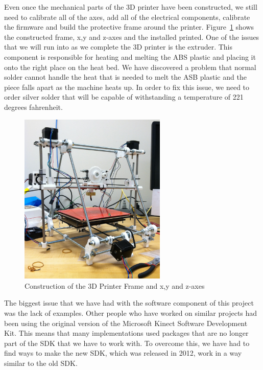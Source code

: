 \documentclass[12pt,twocolumn]{article}
\begin{document}
\indent Even once the mechanical parts of the 3D printer have been constructed, we still need to calibrate all of the axes, add all of the electrical components, calibrate the firmware and build the protective frame around the printer. Figure~\ref{basebuilt} shows the constructed frame, x,y and z-axes and the installed printed. One of the issues that we will run into as we complete the 3D printer is the extruder. This component is responsible for heating and melting the ABS plastic and placing it onto the right place on the heat bed. We have discovered a problem that normal solder cannot handle the heat that is needed to melt the ASB plastic and the piece falls apart as the machine heats up. In order to fix this issue, we need to order silver solder that will be capable of withstanding a temperature of 221 degrees fahrenheit. 
\begin{figure}[H]
\centering
\includegraphics[width=70mm]{photo.JPG}
\caption{Construction of the 3D Printer Frame and x,y and z-axes}
\label{basebuilt}
\end{figure}

\indent 
The biggest issue that we have had with the software component of this project was the lack of examples. Other people who have worked on similar projects had been using the original version of the Microsoft Kinect Software Development Kit. This means that many implementations used packages that are no longer part of the SDK that we have to work with. To overcome this, we have had to find ways to make the new SDK, which was released in 2012, work in a way similar to the old SDK. 
\end{document}
